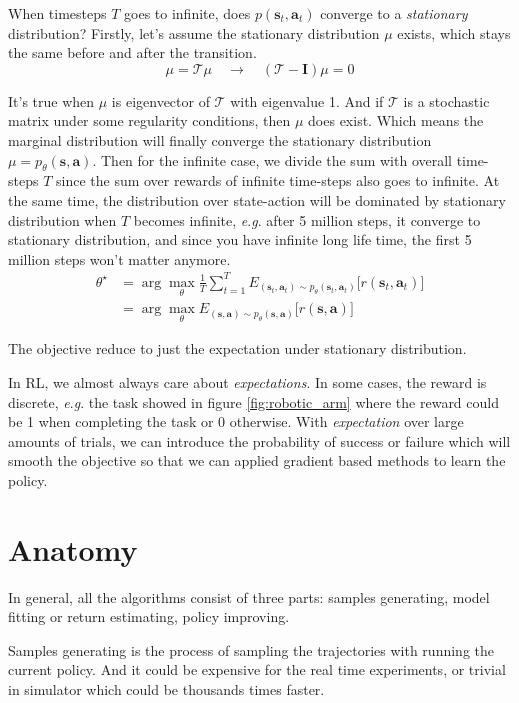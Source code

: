 \documentclass{tufte-handout}
\newcommand{\eg}{\textit{e}.\textit{g}. }
\newcommand{\s}{\mathbf{s}}
\newcommand{\act}{\mathbf{a}}
\begin{document}
When timesteps $T$ goes to infinite, does  $p(\s_t, \act_t)$ converge to a \emph{stationary} distribution? Firstly, let's assume the stationary distribution $\mu$ exists, which stays the same before and after the transition.
\[
  \mu = \mathcal{T} \mu \quad \to \quad (\mathcal{T} - \mathbf{I}) \mu = 0
\]

It's true when $\mu$ is eigenvector of $\mathcal{T}$ with eigenvalue 1. And if $\mathcal{T}$ is a stochastic matrix under some regularity conditions, then
$\mu$ does exist.  Which means the marginal distribution will finally converge the stationary distribution $\mu = p_\theta (\s, \act)$. Then for the infinite case, we divide the sum with overall time-steps $T$ since the sum over rewards of infinite time-steps also goes to infinite. At the same time, the distribution over state-action will be dominated by stationary distribution when $T$ becomes infinite, \eg after 5 million steps, it converge to stationary distribution, and since you have infinite long life time, the first 5 million steps won't matter anymore.
\begin{align*}
\theta^\star &= \arg \max_\theta \frac{1}{T} \sum_{t=1} ^ T E_{(\s_t, \act_t)\sim p_\theta (\s_t, \act_t)} \big[r(\s_t, \act_t) \big] \\
& =\arg \max_\theta E_{(\s, \act)\sim p_\theta (\s, \act)} \big[r(\s, \act) \big]
\end{align*}

The objective reduce to just the expectation under stationary distribution.

In RL, we almost always care about \emph{expectations}. In some cases, the reward is discrete, \eg the task showed in figure \ref{fig:robotic_arm}
where the reward could be 1 when completing the task or 0 otherwise. With \emph{expectation} over large amounts of trials, we can introduce the probability
of success or failure which will smooth the objective so that we can applied gradient based methods to learn the policy.

\section{Anatomy}

In general, all the algorithms consist of three parts: {\color{orange} samples generating}, {\color{green} model fitting or return estimating},
{\color{blue} policy improving}.

Samples generating is the process of sampling the trajectories with running the current policy. And it could be expensive for the real time experiments, or trivial in simulator which could be thousands times faster.
\end{document}
